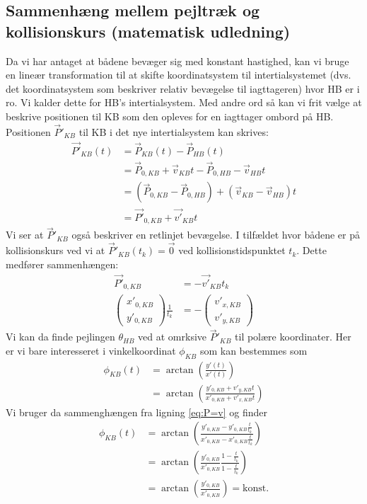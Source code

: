 \documentclass[%
 reprint,
nofootinbib,
aps,
]{revtex4-1}
\begin{document}
\subsection{Sammenhæng mellem pejltræk og kollisionskurs (matematisk udledning)}\label{sec:pejling_betydning}
Da vi har antaget at bådene bevæger sig med konstant hastighed, kan vi bruge en lineær transformation til at skifte koordinatsystem til intertialsystemet (dvs. det koordinatsystem som beskriver relativ bevægelse til iagttageren) hvor HB er i ro. Vi kalder dette for HB's intertialsystem. Med andre ord så kan vi frit vælge at beskrive positionen til KB som den opleves for en iagttager ombord på HB. Positionen $\vec{P}'_{KB}$ til KB i det nye intertialsystem kan skrives:
\begin{align*}
  \vec{P'}_{KB}(t) &= \vec{P}_{KB}(t) - \vec{P}_{HB}(t) \\
  &= \vec{P}_{0,KB} + \vec{v}_{KB}t - \vec{P}_{0,HB} - \vec{v}_{HB}t \\
  &= (\vec{P}_{0,KB} - \vec{P}_{0,HB}) + (\vec{v}_{KB} - \vec{v}_{HB})t \\
  &= \vec{P'}_{0,KB} + \vec{v'}_{KB}t
\end{align*}
Vi ser at $\vec{P}'_{KB}$ også beskriver en retlinjet bevægelse. I tilfældet hvor bådene er på kollisionskurs ved vi at $\vec{P}'_{KB}(t_k) = \vec{0}$ ved kollisionstidspunktet $t_{k}$. Dette medfører sammenhængen:
\begin{align}
  \vec{P'}_{0,KB} &= - \vec{v'}_{KB}t_k \nonumber \\
  \begin{pmatrix} x'_{0,KB} \\ y'_{0,KB} \end{pmatrix}\frac{1}{t_k} &=   -\begin{pmatrix} v'_{x,KB} \\ v'_{y,KB} \end{pmatrix}
  \label{eq:P=v}
\end{align}
Vi kan da finde pejlingen $\theta_{HB}$ ved at omrksive $\vec{P}'_{KB}$ til polære koordinater. Her er vi bare interesseret i vinkelkoordinat $\phi_{KB}$ som kan bestemmes som
\begin{align*}
  \phi_{KB}(t) &= \arctan{\left( \frac{y'(t)}{x'(t)}\right)} \\
  &= \arctan{\left( \frac{y'_{0,KB} + v'_{y,KB}t}{x'_{0,KB} + v'_{x,KB}t}\right)}
\end{align*}
Vi bruger da sammenghængen fra ligning \ref{eq:P=v} og finder
\begin{align*}
  \phi_{KB}(t) &= \arctan{\left( \frac{y'_{0,KB} - y'_{0,KB}\frac{t}{t_k}}{x'_{0,KB} - x'_{0,KB}\frac{t}{t_k}}\right)} \\
  &= \arctan{\left(\frac{y'_{0,KB}}{x'_{0,KB}} \frac{1 - \frac{t}{t_k}}{1 - \frac{t}{t_k}}\right)} \\
  &= \arctan{\left(\frac{y'_{0,KB}}{x'_{0,KB}}\right)} = \text{konst.} \\
\end{align*}
\end{document}
